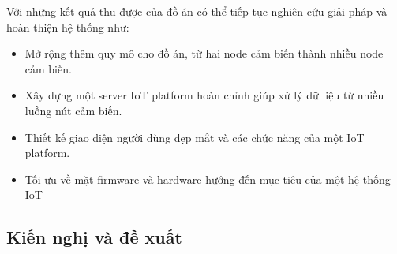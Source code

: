 \documentclass{article} %
\begin{document}
	Với những kết quả thu được của đồ án có thể tiếp tục nghiên cứu giải pháp và hoàn thiện hệ thống như:
	\begin{itemize}
		\item Mở rộng thêm quy mô cho đồ án, từ hai node cảm biến thành nhiều node cảm biến.
		\item Xây dựng một server IoT platform hoàn chỉnh giúp xử lý dữ liệu từ nhiều luồng nút cảm biến.
		\item Thiết kế giao diện người dùng đẹp mắt và các chức năng của một IoT platform.
		\item Tối ưu về mặt firmware và hardware hướng đến mục tiêu của một hệ thống IoT
	\end{itemize}
	
	
	\subsection*{Kiến nghị và đề xuất}

	\newpage
	
	
	\newpage
\end{document}
